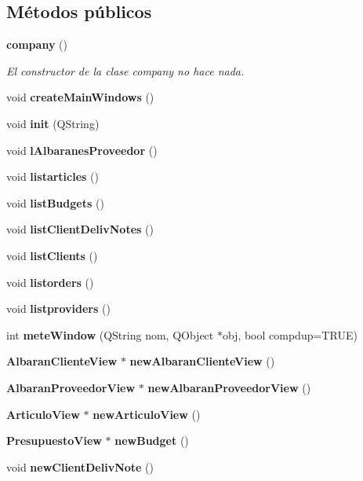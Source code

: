 \subsection*{M\'{e}todos p\'{u}blicos}
\begin{CompactItemize}
\item 
{\bf company} ()\label{classcompany_a0}

\begin{CompactList}\small\item\em El constructor de la clase company no hace nada. \item\end{CompactList}\item 
void {\bf create\-Main\-Windows} ()\label{classcompany_a1}

\item 
void {\bf init} (QString)
\item 
void {\bf l\-Albaranes\-Proveedor} ()\label{classcompany_a3}

\item 
void {\bf listarticles} ()\label{classcompany_a4}

\item 
void {\bf list\-Budgets} ()\label{classcompany_a5}

\item 
void {\bf list\-Client\-Deliv\-Notes} ()\label{classcompany_a6}

\item 
void {\bf list\-Clients} ()\label{classcompany_a7}

\item 
void {\bf listorders} ()\label{classcompany_a8}

\item 
void {\bf listproviders} ()\label{classcompany_a9}

\item 
int {\bf mete\-Window} (QString nom, QObject $\ast$obj, bool compdup=TRUE)\label{classcompany_a10}

\item 
{\bf Albaran\-Cliente\-View} $\ast$ {\bf new\-Albaran\-Cliente\-View} ()
\item 
{\bf Albaran\-Proveedor\-View} $\ast$ {\bf new\-Albaran\-Proveedor\-View} ()
\item 
{\bf Articulo\-View} $\ast$ {\bf new\-Articulo\-View} ()
\item 
{\bf Presupuesto\-View} $\ast$ {\bf new\-Budget} ()
\item 
void {\bf new\-Client\-Deliv\-Note} ()\label{classcompany_a15}


\end{CompactItemize}
